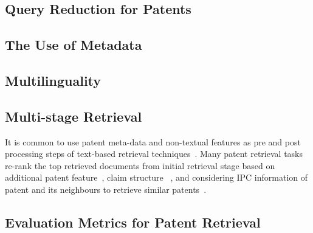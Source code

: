 \subsection{Query Reduction for Patents}


%

\subsection{The Use of Metadata}

\label{sec:metadata}

\subsection{Multilinguality}


\subsection{Multi-stage Retrieval}
It is common to use patent meta-data and non-textual features as pre and post processing steps of text-based retrieval techniques~\citep{lopez2009multiple}. Many patent retrieval tasks re-rank the top retrieved documents from initial retrieval stage based on additional patent feature~\citep{lopez2010experiments}, claim structure ~\citep{mase2005proposal}, and considering IPC information of patent and its neighbours to retrieve similar patents~\citep{verma2011exploring}. 

\subsection{Evaluation Metrics for Patent Retrieval}



%

